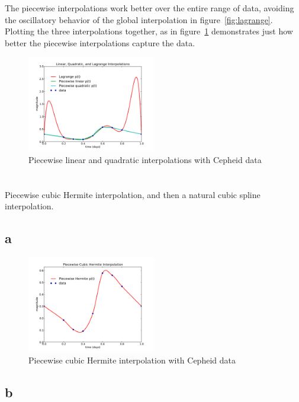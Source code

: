 \documentclass[11pt,letterpaper]{article}
\begin{document}
The piecewise interpolations work better over the entire range of data,
avoiding the oscillatory behavior of the global interpolation in figure~\ref{fig:lagrange}. Plotting the three interpolations together, as in 
figure~\ref{fig:lin-quad-lag} demonstrates just how better the piecewise 
interpolations capture the data.

\begin{figure}[bth]
\centering
\includegraphics[width=0.5\textwidth]{linear_quadratic_lagrange_interpolation.pdf}
\caption{Piecewise linear and quadratic interpolations with Cepheid data}
\label{fig:lin-quad-lag}
\end{figure}

\section{}
Piecewise cubic Hermite interpolation, and then a natural cubic spline 
interpolation.

\subsection*{a}

\begin{figure}[bth]
\centering
\includegraphics[width=0.5\textwidth]{hermite_interpolation.pdf}
\caption{Piecewise cubic Hermite interpolation with Cepheid data}
\label{fig:hermite}
\end{figure}


\subsection*{b}
\end{document}
